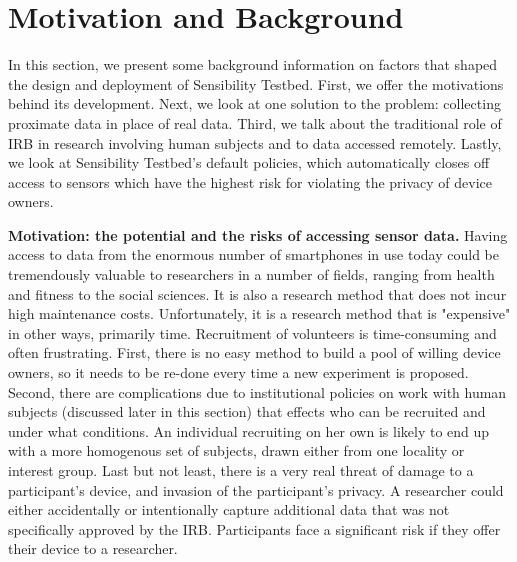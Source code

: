 \section{Motivation and Background}\label{sec-motivation}

In this section, we present some background information on 
factors that shaped the design and deployment of 
Sensibility Testbed. First, we offer the motivations behind its 
development. 
Next, we look at one solution to the problem: collecting proximate 
data in place of real data. Third, we talk about 
the traditional role of IRB in research involving human subjects 
and to data accessed remotely. Lastly, we look at Sensibility Testbed's 
default policies, which automatically closes off access to 
sensors which have the highest risk for violating the privacy of 
device owners.

\textbf{Motivation: the potential and the risks of accessing sensor data.}
Having access to data from the enormous number of smartphones 
in use today could be tremendously valuable to researchers in a 
number of fields, ranging from health and fitness to the social sciences. 
It is also a research method that does not incur high maintenance costs. 
Unfortunately, it is a research method that is "expensive" in other ways, 
primarily time. Recruitment of volunteers is time-consuming and often 
frustrating. %
First, there is no easy method to build a pool of willing device owners, 
so it needs to be re-done every time a new experiment is proposed. 
Second, there are complications due to institutional policies on work 
with human subjects (discussed later in this section) that effects who 
can be recruited and under what conditions. An individual recruiting 
on her own is likely to end up with a more homogenous set of subjects, 
drawn either from one locality or interest group. Last but not least, there 
is a very real threat of damage to a participant's device, and invasion 
of the participant's privacy.  A researcher could either accidentally or
intentionally capture additional data that was not specifically approved
by the IRB.  Participants face a significant risk if 
they offer their device to a researcher.

